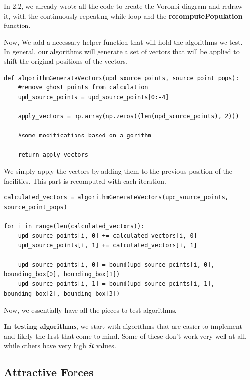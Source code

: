\documentclass{article}
\begin{document}
In 2.2, we already wrote all the code to create the Voronoi diagram and redraw it, with the continuously repeating while loop and the \textbf{recomputePopulation} function. 

Now, We add a necessary helper function that will hold the algorithms we test. In general, our algorithms will generate a set of vectors that will be applied to shift the original positions of the vectors. 

\begin{verbatim} 
def algorithmGenerateVectors(upd_source_points, source_point_pops):
    #remove ghost points from calculation
    upd_source_points = upd_source_points[0:-4]
    
    apply_vectors = np.array(np.zeros((len(upd_source_points), 2)))
    
    #some modifications based on algorithm
    
    return apply_vectors
\end{verbatim}

We simply apply the vectors by adding them to the previous position of the facilities. This part is recomputed with each iteration.  


\begin{verbatim} 
calculated_vectors = algorithmGenerateVectors(upd_source_points, source_point_pops)
    
for i in range(len(calculated_vectors)):
    upd_source_points[i, 0] += calculated_vectors[i, 0]
    upd_source_points[i, 1] += calculated_vectors[i, 1]

    upd_source_points[i, 0] = bound(upd_source_points[i, 0], bounding_box[0], bounding_box[1])        
    upd_source_points[i, 1] = bound(upd_source_points[i, 1], bounding_box[2], bounding_box[3])
\end{verbatim}

Now, we essentially have all the pieces to test algorithms. 



\textbf{In testing algorithms}, we start with algorithms that are easier to implement and likely the first that come to mind. Some of these don't work very well at all, while others have very high \textit{\textbf{it}} values.

\vspace{12pt}
\subsection{Attractive Forces}
\end{document}
